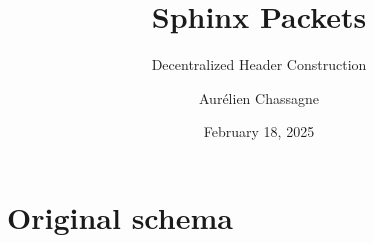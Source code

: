 \documentclass[aspectratio=1610]{beamer}
\title{Sphinx Packets}
\subtitle{Decentralized Header Construction}
\author{Aurélien Chassagne}
\date{February 18, 2025} %
\begin{document}
\begin{frame}
\titlepage
\end{frame}


\scriptsize
\section{Original schema}




\end{document}
